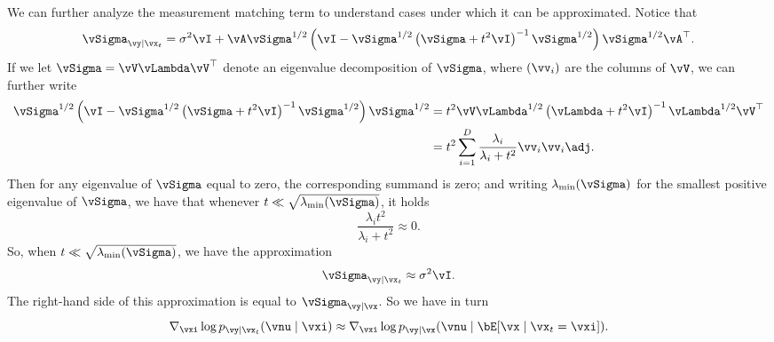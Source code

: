 \documentclass[../../book-main.tex]{subfiles}
\begin{document}
\begin{example}
    We can further analyze the measurement matching term to
    understand cases under
    which it can be approximated. Notice that
    \begin{equation}
        \vSigma_{\vy \mid \vx_t}
        =
        \sigma^2 \vI + \vA\vSigma^{1/2} \left(
            \vI - \vSigma^{1/2}\left(
                \vSigma + t^2 \vI
            \right)^{-1}
            \vSigma^{1/2}
        \right)\vSigma^{1/2}\vA^\top.
    \end{equation}
    If we let $\vSigma = \vV \vLambda \vV^\top$ denote an eigenvalue
    decomposition
    of $\vSigma$, where $(\vv_i)$ are the columns of $\vV$, we can further write
    \begin{align}
        \vSigma^{1/2}\left(
            \vI - \vSigma^{1/2}\left(
                \vSigma + t^2 \vI
            \right)^{-1}
            \vSigma^{1/2}
        \right) \vSigma^{1/2}
        &=
        t^2 \vV \vLambda^{1/2}\left(
            \vLambda + t^2 \vI
        \right)^{-1}
        \vLambda^{1/2}
        \vV^\top
        \\
        &=
        t^2 \sum_{i=1}^D
        \frac{\lambda_i}{\lambda_i + t^2}
        \vv_i \vv_i\adj.
    \end{align}
    Then for any eigenvalue of $\vSigma$ equal to zero, the
    corresponding summand
    is zero; and
    writing $\lambda_{\min}(\vSigma)$ for the smallest positive eigenvalue of
    $\vSigma$, we have
    that whenever $t \ll
    \sqrt{\lambda_{\min}(\vSigma)}$, it holds
    \begin{equation}
        \frac{\lambda_i t^2}{\lambda_i + t^2} \approx 0.
    \end{equation}
    So, when $t \ll \sqrt{\lambda_{\min}(\vSigma)}$, we have the approximation
    \begin{equation}
        \vSigma_{\vy \mid \vx_t} \approx \sigma^2 \vI.
    \end{equation}
    The right-hand side of this approximation is equal to
    $\vSigma_{\vy \mid \vx}$.
    So we have in turn
    \begin{equation}
        \nabla_{\vxi} \log p_{\vy \mid \vx_t}(\vnu \mid \vxi)
        \approx
        \nabla_{\vxi} \log p_{\vy \mid \vx}(\vnu \mid \bE[\vx \mid
        \vx_t = \vxi]).
        \label{eq:conditional-posterior-measurementmatching-gaussian-case-dps-approx}
    \end{equation}

\end{example}
\end{document}
